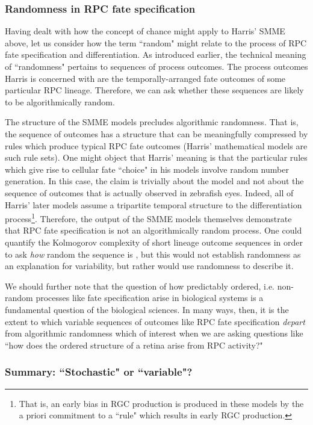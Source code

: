 \subsubsection{Randomness in RPC fate specification}

Having dealt with how the concept of chance might apply to Harris' SMME above, let us consider how the term ``random" might relate to the process of RPC fate specification and differentiation. As introduced earlier, the technical meaning of ``randomness" pertains to sequences of process outcomes. The process outcomes Harris is concerned with are the temporally-arranged fate outcomes of some particular RPC lineage. Therefore, we can ask whether these sequences are likely to be algorithmically random.

The structure of the SMME models precludes algorithmic randomness. That is, the sequence of outcomes has a structure that can be meaningfully compressed by rules which produce typical RPC fate outcomes (Harris' mathematical models are such rule sets). One might object that Harris' meaning is that the particular rules which give rise to cellular fate ``choice" in his models involve random number generation. In this case, the claim is trivially about the model and not about the sequence of outcomes that is actually observed in zebrafish eyes. Indeed, all of Harris' later models assume a tripartite temporal structure to the differentiation process\footnote{That is, an early bias in RGC production is produced in these models by the a priori commitment to a ``rule" which results in early RGC production.}. Therefore, the output of the SMME models themselves demonstrate that RPC fate specification is not an algorithmically random process. One could quantify the Kolmogorov complexity of short lineage outcome sequences in order to ask \textit{how} random the sequence is \cite{Soler-Toscano2014}, but this would not establish randomness as an explanation for variability, but rather would use randomness to describe it.

We should further note that the question of how predictably ordered, i.e. non-random processes like fate specification arise in biological systems is a fundamental question of the biological sciences. In many ways, then, it is the extent to which variable sequences of outcomes like RPC fate specification \textit{depart} from algorithmic randomness which of interest when we are asking questions like ``how does the ordered structure of a retina arise from RPC activity?"

\subsubsection{Summary: ``Stochastic" or ``variable"?}

